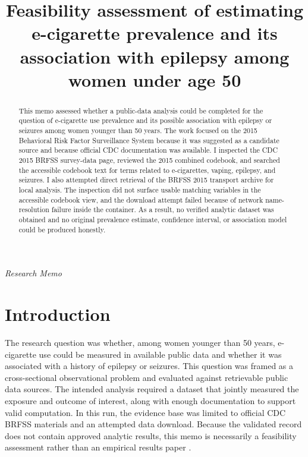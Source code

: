 \documentclass[11pt]{article}
\title{Feasibility assessment of estimating e-cigarette prevalence and its association with epilepsy among women under age 50}
\author{}
\date{}
\begin{document}
\maketitle

\begin{center}\small\textit{Research Memo}\end{center}

\begin{abstract}

This memo assessed whether a public-data analysis could be completed for the question of e-cigarette use prevalence and its possible association with epilepsy or seizures among women younger than 50 years. The work focused on the 2015 Behavioral Risk Factor Surveillance System because it was suggested as a candidate source and because official CDC documentation was available. I inspected the CDC 2015 BRFSS survey-data page, reviewed the 2015 combined codebook, and searched the accessible codebook text for terms related to e-cigarettes, vaping, epilepsy, and seizures. I also attempted direct retrieval of the BRFSS 2015 transport archive for local analysis. The inspection did not surface usable matching variables in the accessible codebook view, and the download attempt failed because of network name-resolution failure inside the container. As a result, no verified analytic dataset was obtained and no original prevalence estimate, confidence interval, or association model could be produced honestly.

\end{abstract}

\section{Introduction}
The research question was whether, among women younger than 50 years, e-cigarette use could be measured in available public data and whether it was associated with a history of epilepsy or seizures. This question was framed as a cross-sectional observational problem and evaluated against retrievable public data sources. The intended analysis required a dataset that jointly measured the exposure and outcome of interest, along with enough documentation to support valid computation. In this run, the evidence base was limited to official CDC BRFSS materials and an attempted data download. Because the validated record does not contain approved analytic results, this memo is necessarily a feasibility assessment rather than an empirical results paper \cite{ref1} \cite{ref2} \cite{ref3}.
\end{document}
